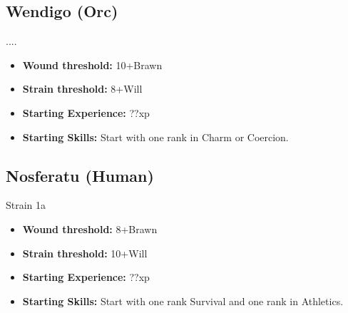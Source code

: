 \documentclass{book}
\begin{document}
\begin{multicols}{2}
	\subsection{Wendigo (Orc)}
	....
	
	\begin{itemize}
		\item \textbf{Wound threshold:} 10+Brawn
		\item \textbf{Strain threshold:} 8+Will
		\item \textbf{Starting Experience:} ??xp
		\item \textbf{Starting Skills:} Start with one rank in Charm or Coercion.

	\end{itemize}
	
	\subsection{Nosferatu (Human)}
	Strain 1a
	
	\begin{itemize}
		\item \textbf{Wound threshold:} 8+Brawn
		\item \textbf{Strain threshold:} 10+Will
		\item \textbf{Starting Experience:} ??xp
		\item \textbf{Starting Skills:} Start with one rank Survival and one rank in Athletics.

	\end{itemize}
	
	
\end{multicols}
\end{document}
